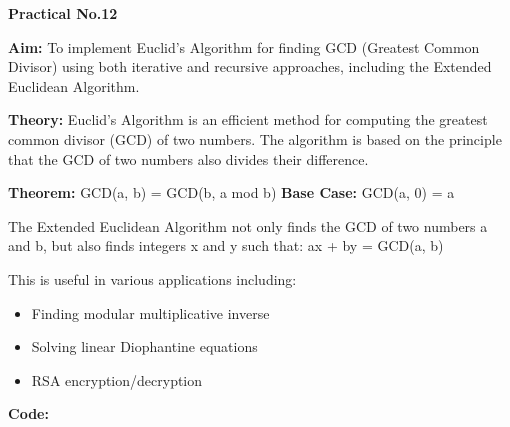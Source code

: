 \documentclass[a4paper,12pt]{article}
\newcommand{\heading}[1]{{\fontsize{16}{18}\selectfont\textbf{#1}}}
\newcommand{\subheading}[1]{{\fontsize{14}{16}\selectfont\textbf{#1}}}
\newcommand{\normaltext}[1]{{\fontsize{12}{14}\selectfont#1}}
\begin{document}
\heading{Practical No.12}

\vspace{0.5cm}

\subheading{Aim:}
\normaltext{To implement Euclid's Algorithm for finding GCD (Greatest Common Divisor) using both iterative and recursive approaches, including the Extended Euclidean Algorithm.}

\vspace{0.5cm}

\subheading{Theory:}
\normaltext{Euclid's Algorithm is an efficient method for computing the greatest common divisor (GCD) of two numbers. The algorithm is based on the principle that the GCD of two numbers also divides their difference.}

\vspace{0.3cm}
\normaltext{\textbf{Theorem:} GCD(a, b) = GCD(b, a mod b)}
\normaltext{\textbf{Base Case:} GCD(a, 0) = a}

\vspace{0.3cm}
\normaltext{The Extended Euclidean Algorithm not only finds the GCD of two numbers a and b, but also finds integers x and y such that:}
\normaltext{ax + by = GCD(a, b)}

\vspace{0.3cm}
\normaltext{This is useful in various applications including:}
\begin{itemize}
    \item Finding modular multiplicative inverse
    \item Solving linear Diophantine equations
    \item RSA encryption/decryption
\end{itemize}

\vspace{0.5cm}

\subheading{Code:}
\end{document}
